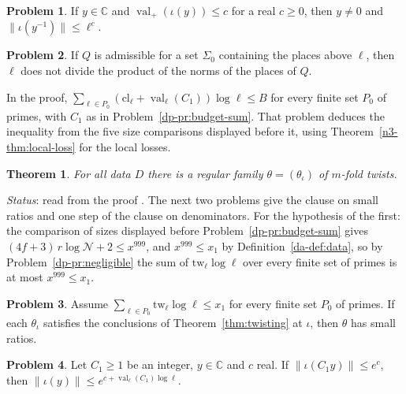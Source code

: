 \documentclass[reqno]{amsart}
\theoremstyle{definition}
\newtheorem{problem}{Problem}[section]
\theoremstyle{plain}
\newtheorem{theorem}{Theorem}[section]
\newcommand{\C}{\mathbb{C}}
\newcommand{\val}{\operatorname{val}}
\newcommand{\cl}{\mathrm{cl}}
\begin{document}
\begin{problem}\label{pr:inverse}
If \(y \in \C\) and \(\val_+(\iota(y)) \le c\) for a real \(c \ge 0\), then \(y \ne 0\) and \(\lVert\iota(y^{-1})\rVert \le \ell^{c}\).
\end{problem}

\begin{problem}\label{pr:coprime}
If \(Q\) is admissible for a set \(\Sigma_0\) containing the places above \(\ell\), then \(\ell\) does not divide the product of the norms of the places of \(Q\).
\end{problem}

In the proof, \(\sum_{\ell \in P_0}(\cl_\ell + \val_\ell(C_1))\log\ell \le B\) for every finite set \(P_0\) of primes, with \(C_1\) as in Problem~\ref{dp-pr:budget-sum}.  That problem deduces the inequality from the five size comparisons displayed before it, using Theorem~\ref{n3-thm:local-loss} for the local losses.

\begin{theorem}\label{thm:regular}
For all data \(D\) there is a regular family \(\theta = (\theta_\iota)\) of \(m\)-fold twists.
\end{theorem}

\emph{Status}: read from the proof \cite{GL}.  The next two problems give the clause on small ratios and one step of the clause on denominators.  For the hypothesis of the first: the comparison of sizes displayed before Problem~\ref{dp-pr:budget-sum} gives \((4f + 3)\, r \log \mathcal N + 2 \le x^{999}\), and \(x^{999} \le x_1\) by Definition~\ref{da-def:data}, so by Problem~\ref{dp-pr:negligible} the sum of \(\mathrm{tw}_\ell \log \ell\) over every finite set of primes is at most \(x^{999} \le x_1\).

\begin{problem}\label{pr:assembly}
Assume \(\sum_{\ell \in P_0} \mathrm{tw}_\ell\log \ell \le x_1\) for every finite set \(P_0\) of primes.  If each \(\theta_\iota\) satisfies the conclusions of Theorem~\ref{thm:twisting} at \(\iota\), then \(\theta\) has small ratios.
\end{problem}

\begin{problem}\label{pr:class-number}
Let \(C_1 \ge 1\) be an integer, \(y \in \C\) and \(c\) real.  If \(\lVert\iota(C_1y)\rVert \le e^{c}\), then \(\lVert\iota(y)\rVert \le e^{c + \val_\ell(C_1)\log\ell}\).
\end{problem}
\end{document}

